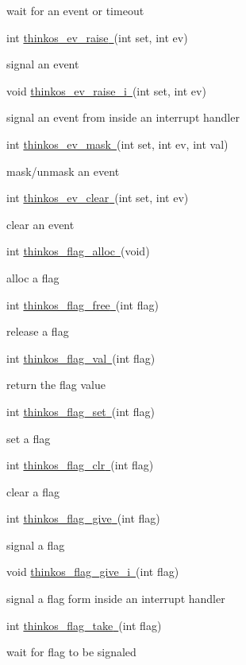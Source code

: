 {{wait for an event or timeout }

{int
}{\protect\hyperlink{h.4f1mdlm}{thinkos\_ev\_raise}}{\protect\hyperlink{h.4f1mdlm}{~}}{(int
set, int ev)}

{signal an event }

{void
}{\protect\hyperlink{h.2u6wntf}{thinkos\_ev\_raise\_i}}{\protect\hyperlink{h.2u6wntf}{~}}{(int
set, int ev)}

{signal an event from inside an interrupt handler }

{int
}{\protect\hyperlink{h.19c6y18}{thinkos\_ev\_mask}}{\protect\hyperlink{h.19c6y18}{~}}{(int
set, int ev, int val)}

{mask/unmask an event }

{int
}{\protect\hyperlink{h.3tbugp1}{thinkos\_ev\_clear}}{\protect\hyperlink{h.3tbugp1}{~}}{(int
set, int ev)}

{clear an event }

{int
}{\protect\hyperlink{h.nmf14n}{thinkos\_flag\_alloc}}{\protect\hyperlink{h.nmf14n}{~}}{(void)}

{alloc a flag }

{int
}{\protect\hyperlink{h.37m2jsg}{thinkos\_flag\_free}}{\protect\hyperlink{h.37m2jsg}{~}}{(int
flag)}

{release a flag }

{int
}{\protect\hyperlink{h.1mrcu09}{thinkos\_flag\_val}}{\protect\hyperlink{h.1mrcu09}{~}}{(int
flag)}

{return the flag value }

{int
}{\protect\hyperlink{h.46r0co2}{thinkos\_flag\_set}}{\protect\hyperlink{h.46r0co2}{~}}{(int
flag)}

{set a flag }

{int
}{\protect\hyperlink{h.2lwamvv}{thinkos\_flag\_clr}}{\protect\hyperlink{h.2lwamvv}{~}}{(int
flag)}

{clear a flag }

{int
}{\protect\hyperlink{h.111kx3o}{thinkos\_flag\_give}}{\protect\hyperlink{h.111kx3o}{~}}{(int
flag)}

{signal a flag }

{void
}{\protect\hyperlink{h.3l18frh}{thinkos\_flag\_give\_i}}{\protect\hyperlink{h.3l18frh}{~}}{(int
flag)}

{signal a flag form inside an interrupt handler }

{int
}{\protect\hyperlink{h.206ipza}{thinkos\_flag\_take}}{\protect\hyperlink{h.206ipza}{~}}{(int
flag)}

{wait for flag to be signaled }

}
